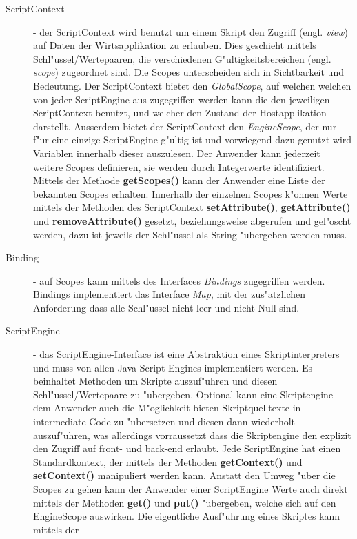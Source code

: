 \begin{description}
    \item[ScriptContext] - der ScriptContext wird benutzt um einem Skript den Zugriff (engl. \emph{view}) auf Daten der 
    Wirtsapplikation zu erlauben. Dies geschieht mittels Schl"ussel/Wertepaaren, die verschiedenen G"ultigkeitsbereichen
    (engl. \emph{scope}) zugeordnet sind. Die Scopes unterscheiden sich in Sichtbarkeit und Bedeutung. Der ScriptContext 
    bietet den \emph{GlobalScope}, auf welchen welchen von jeder ScriptEngine aus zugegriffen werden kann die den
    jeweiligen ScriptContext benutzt, und welcher den Zustand der Hostapplikation darstellt.
    Ausserdem bietet der ScriptContext den \emph{EngineScope}, der nur f"ur eine einzige ScriptEngine g"ultig ist und 
    vorwiegend dazu genutzt wird Variablen innerhalb dieser auszulesen.
    Der Anwender kann jederzeit weitere Scopes definieren, sie werden durch Integerwerte identifiziert. Mittels der
    Methode \textbf{getScopes()} kann der Anwender eine Liste der bekannten Scopes erhalten. Innerhalb der einzelnen Scopes
    k"onnen Werte mittels der Methoden des ScriptContext \textbf{setAttribute()}, \textbf{getAttribute()} und \textbf{removeAttribute()} 
    gesetzt, beziehungsweise abgerufen und gel"oscht werden, dazu ist jeweils der Schl"ussel als String "ubergeben werden muss.
    \item[Binding] - auf Scopes kann mittels des Interfaces \emph{Bindings} zugegriffen werden. Bindings implementiert
    das Interface \emph{Map}, mit der zus"atzlichen Anforderung dass alle Schl"ussel nicht-leer und nicht Null sind.
    \item[ScriptEngine] - das ScriptEngine-Interface ist eine Abstraktion eines Skriptinterpreters und muss von
    allen Java Script Engines implementiert werden. Es beinhaltet Methoden um Skripte auszuf"uhren und diesen
    Schl"ussel/Wertepaare zu "ubergeben. Optional kann eine Skriptengine dem Anwender auch die M"oglichkeit bieten
    Skriptquelltexte in intermediate Code zu "ubersetzen und diesen dann wiederholt auszuf"uhren, was allerdings
    vorraussetzt dass die Skriptengine den explizit den Zugriff auf front- und back-end erlaubt. Jede ScriptEngine hat einen
    Standardkontext, der mittels der Methoden \textbf{getContext()} und \textbf{setContext()} manipuliert werden kann. Anstatt den
    Umweg "uber die Scopes zu gehen kann der Anwender einer ScriptEngine Werte auch direkt mittels der Methoden \textbf{get()} und 
    \textbf{put()} "ubergeben, welche sich auf den EngineScope auswirken. Die eigentliche Ausf"uhrung eines Skriptes kann mittels der

\end{description}
